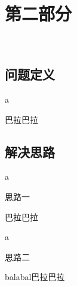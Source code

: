 \section{第二部分}
\
\subsection{问题定义}
\begin{frame}{a}
	\begin{defi}
		巴拉巴拉
	\end{defi}
\end{frame}
\subsection{解决思路}
\begin{frame}{a}
	\begin{solu}
		思路一
	\end{solu}
	\vspace{1.4cm}
	巴拉巴拉
\end{frame}

\begin{frame}{a}	
	\setcounter{solu}{1}
	\begin{solu}
		思路二
	\end{solu}
	\vspace{1.4cm}
	balabal巴拉巴拉
\end{frame}
